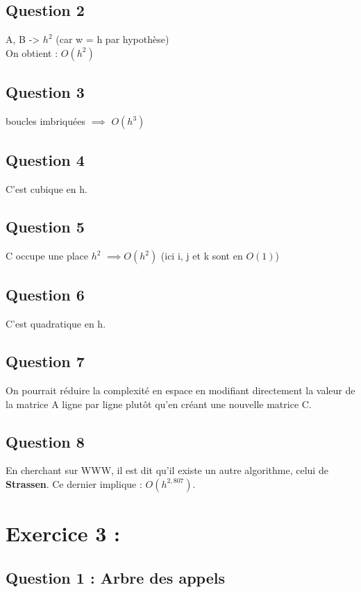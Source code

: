 \documentclass{article}
\begin{document}
\subsection*{Question 2}
\qquad A, B -> $h^2$ (car w = h par hypothèse)
\\
\qquad On obtient : $O(h^2)$

\subsection*{Question 3}
 boucles imbriquées $\implies$ $O(h^3)$

\subsection*{Question 4}
\qquad  C'est cubique en h. 

\subsection*{Question 5}
\qquad C occupe une place $h^2$ $\implies O(h^2)$ (ici i, j et k sont en $O(1)$)

\subsection*{Question 6}
\qquad C'est quadratique en h. 

\subsection*{Question 7}
\qquad On pourrait réduire la complexité en espace en modifiant directement la valeur de la matrice A ligne par ligne plutôt qu'en créant une nouvelle matrice C.

\subsection*{Question 8}
\qquad En cherchant sur WWW, il est dit qu'il existe un autre algorithme, celui de \textbf{Strassen}. Ce dernier implique : $O(h^{2,807})$.


\section*{\textbf{Exercice 3 :}}
\subsection*{Question 1 : Arbre des appels}
\end{document}

